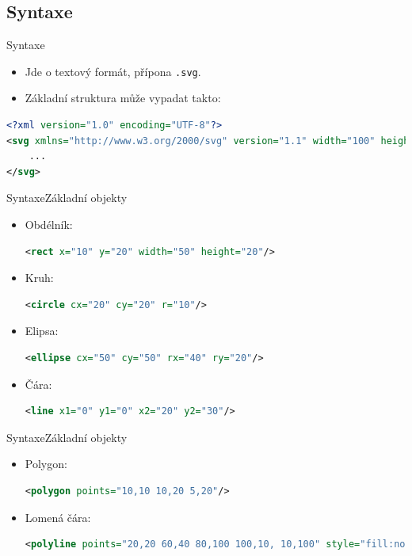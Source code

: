 \subsection{Syntaxe}
\begin{frame}[t,fragile]{Syntaxe}
    \begin{itemize}
        \item Jde o textový formát, přípona \texttt{.svg}.
        \item Základní struktura může vypadat takto:
    \end{itemize}
    \begin{lstlisting}[language=XML]
<?xml version="1.0" encoding="UTF-8"?>
<svg xmlns="http://www.w3.org/2000/svg" version="1.1" width="100" height="100">
    ...
</svg>
    \end{lstlisting}
\end{frame}

\begin{frame}[t,fragile]{Syntaxe}{Základní objekty}
    \begin{itemize}
        \item Obdélník:
        \begin{lstlisting}[language=XML]
<rect x="10" y="20" width="50" height="20"/>
        \end{lstlisting}
        \item Kruh:
        \begin{lstlisting}[language=XML]
<circle cx="20" cy="20" r="10"/>
        \end{lstlisting}
        \item Elipsa:
        \begin{lstlisting}[language=XML]
<ellipse cx="50" cy="50" rx="40" ry="20"/>
        \end{lstlisting}
        \item Čára:
        \begin{lstlisting}[language=XML]
<line x1="0" y1="0" x2="20" y2="30"/>
        \end{lstlisting}
    \end{itemize}
\end{frame}

\begin{frame}[t,fragile]{Syntaxe}{Základní objekty}
    \begin{itemize}
        \item Polygon:
        \begin{lstlisting}[language=XML]
<polygon points="10,10 10,20 5,20"/>
        \end{lstlisting}
        \item Lomená čára:
        \begin{lstlisting}[language=XML]
<polyline points="20,20 60,40 80,100 100,10, 10,100" style="fill:none"/>
        \end{lstlisting}
    \end{itemize}
\end{frame}

